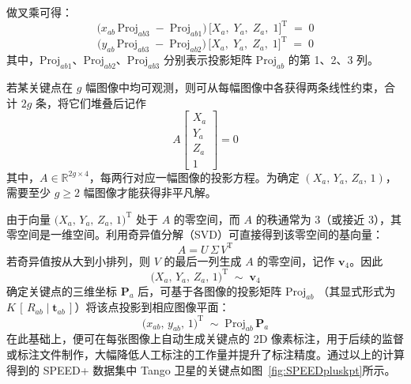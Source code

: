 做叉乘可得：
\begin{equation}
	\bigl(x_{ab}\,\mathrm{Proj}_{ab3} \;-\; \mathrm{Proj}_{ab1}\bigr)\,
	\bigl[X_a,\;Y_a,\;Z_a,\;1\bigr]^\mathrm{T} \;=\; 0
\end{equation}
\begin{equation}
	\bigl(y_{ab}\,\mathrm{Proj}_{ab3} \;-\; \mathrm{Proj}_{ab2}\bigr)\,
	\bigl[X_a,\;Y_a,\;Z_a,\;1\bigr]^\mathrm{T} \;=\; 0
\end{equation}
其中，$\mathrm{Proj}_{ab1}$、$\mathrm{Proj}_{ab2}$、$\mathrm{Proj}_{ab3}$ 分别表示投影矩阵 $\mathrm{Proj}_{ab}$ 的第 1、2、3 列。

若某关键点在 $g$ 幅图像中均可观测，则可从每幅图像中各获得两条线性约束，合计 $2g$ 条，将它们堆叠后记作
\begin{equation}\label{eq:Aeq0}
	A
	\begin{bmatrix}
		X_a\\[3pt] Y_a\\[3pt] Z_a\\[3pt] 1
	\end{bmatrix}
	= 0
\end{equation}
其中，$A \in \mathbb{R}^{2g\times 4}$，每两行对应一幅图像的投影方程。为确定 $(X_a,\,Y_a,\,Z_a,\,1)$，需要至少 $g \ge 2$ 幅图像才能获得非平凡解。

由于向量 $\bigl(X_a,\,Y_a,\,Z_a,\,1\bigr)^{\mathrm{T}}$ 处于 $A$ 的零空间，而 $A$ 的秩通常为 3（或接近 3），其零空间是一维空间。利用奇异值分解（SVD）可直接得到该零空间的基向量：
\begin{equation}
	A = U\,\Sigma\,V^\mathrm{T}
\end{equation}
若奇异值按从大到小排列，则 $V$ 的最后一列生成 $A$ 的零空间，记作 $\mathbf{v}_4$。因此
\begin{equation}
	\bigl(X_a,\,Y_a,\,Z_a,\,1\bigr)^\mathrm{T}
	\;\sim\;
	\mathbf{v}_4
\end{equation}
确定关键点的三维坐标 $\mathbf{P}_a$ 后，可基于各图像的投影矩阵 $\mathrm{Proj}_{ab}$
（其显式形式为 $K\,[\,R_{ab}\mid\mathbf{t}_{ab}\,]$）将该点投影到相应图像平面：
\begin{equation}
	\bigl(x_{ab},\,y_{ab},\,1\bigr)^\mathrm{T}
	\;\sim\;
	\mathrm{Proj}_{ab}\,\mathbf{P}_a
\end{equation}
在此基础上，便可在每张图像上自动生成关键点的 2D 像素标注，用于后续的监督或标注文件制作，大幅降低人工标注的工作量并提升了标注精度。通过以上的计算得到的 SPEED+ 数据集中 Tango 卫星的关键点如图~\ref{fig:SPEEDpluskpt}所示。





